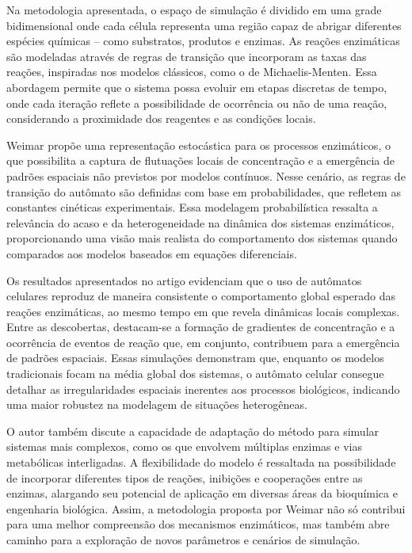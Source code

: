 \documentclass[12pt,oneside]{report}
\begin{document}
Na metodologia apresentada, o espaço de simulação é dividido em uma grade bidimensional onde cada célula representa uma região capaz de abrigar diferentes espécies químicas – como substratos, produtos e enzimas. As reações enzimáticas são modeladas através de regras de transição que incorporam as taxas das reações, inspiradas nos modelos clássicos, como o de Michaelis-Menten. Essa abordagem permite que o sistema possa evoluir em etapas discretas de tempo, onde cada iteração reflete a possibilidade de ocorrência ou não de uma reação, considerando a proximidade dos reagentes e as condições locais.

Weimar propõe uma representação estocástica para os processos enzimáticos, o que possibilita a captura de flutuações locais de concentração e a emergência de padrões espaciais não previstos por modelos contínuos. Nesse cenário, as regras de transição do autômato são definidas com base em probabilidades, que refletem as constantes cinéticas experimentais. Essa modelagem probabilística ressalta a relevância do acaso e da heterogeneidade na dinâmica dos sistemas enzimáticos, proporcionando uma visão mais realista do comportamento dos sistemas quando comparados aos modelos baseados em equações diferenciais.

Os resultados apresentados no artigo evidenciam que o uso de autômatos celulares reproduz de maneira consistente o comportamento global esperado das reações enzimáticas, ao mesmo tempo em que revela dinâmicas locais complexas. Entre as descobertas, destacam-se a formação de gradientes de concentração e a ocorrência de eventos de reação que, em conjunto, contribuem para a emergência de padrões espaciais. Essas simulações demonstram que, enquanto os modelos tradicionais focam na média global dos sistemas, o autômato celular consegue detalhar as irregularidades espaciais inerentes aos processos biológicos, indicando uma maior robustez na modelagem de situações heterogêneas.

O autor também discute a capacidade de adaptação do método para simular sistemas mais complexos, como os que envolvem múltiplas enzimas e vias metabólicas interligadas. A flexibilidade do modelo é ressaltada na possibilidade de incorporar diferentes tipos de reações, inibições e cooperações entre as enzimas, alargando seu potencial de aplicação em diversas áreas da bioquímica e engenharia biológica. Assim, a metodologia proposta por Weimar não só contribui para uma melhor compreensão dos mecanismos enzimáticos, mas também abre caminho para a exploração de novos parâmetros e cenários de simulação.
\end{document}
